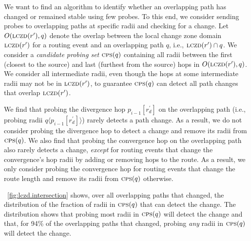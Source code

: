   We want to find an
algorithm to identify whether an overlapping path has changed or
remained stable using few probes.  To this end, we consider sending
probes to overlapping paths at specific radii and checking for
a change.  Let $O(\mathrm{\textsc{lczd}}(r'), q)$ denote the overlap between the
local change zone domain $\mathrm{\textsc{lczd}}(r')$ for a routing event and an
overlapping path $q$, i.e., $\mathrm{\textsc{lczd}}(r')\cap{}q$.  We consider
a \emph{candidate probing set} $\mathrm{\textsc{cps}}(q)$ containing all radii
between the first (closest to the source) and last (furthest from
the source) hops in $O(\mathrm{\textsc{lczd}}(r'), q)$.  We consider all intermediate
radii, even though the hops at some intermediate radii may not be in
$\mathrm{\textsc{lczd}}(r')$,\footnotemark{} to guarantee $\mathrm{\textsc{cps}}(q)$ can detect all
path changes that overlap $\mathrm{\textsc{lczd}}(r')$.


We find that probing the divergence hop $p_{i-1}[r^\prime_d]$ on the
overlapping path (i.e., probing radii $q\langle p_{i-1}[r^\prime_d]
\rangle$) rarely detects a path change.  As a result, we do not
consider probing the divergence hop to detect a change and remove
its radii from $\mathrm{\textsc{cps}}(q)$.\footnotemark{}  We also find that probing
the convergence hop on the overlapping path also rarely detects
a change, \emph{except} for routing events that change the
convergence's hop radii by adding or removing hops to the route.  As
a result, we only consider probing the convergence hop for routing
events that change the route length and remove its radii from
$\mathrm{\textsc{cps}}(q)$ otherwise.




\figstr~\ref{fig:lczd.intersection} shows, over all overlapping
paths that changed, the distribution of the fraction of radii in
$\mathrm{\textsc{cps}}(q)$ that can detect the change.  The distribution shows that
probing most radii in $\mathrm{\textsc{cps}}(q)$ will detect the change and
that, for 94\% of the overlapping paths that changed, probing
\emph{any} radii in $\mathrm{\textsc{cps}}(q)$ will detect the change.


